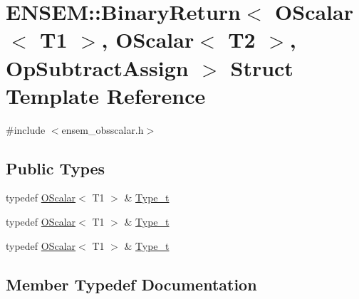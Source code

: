 \hypertarget{structENSEM_1_1BinaryReturn_3_01OScalar_3_01T1_01_4_00_01OScalar_3_01T2_01_4_00_01OpSubtractAssign_01_4}{}\section{E\+N\+S\+EM\+:\+:Binary\+Return$<$ O\+Scalar$<$ T1 $>$, O\+Scalar$<$ T2 $>$, Op\+Subtract\+Assign $>$ Struct Template Reference}
\label{structENSEM_1_1BinaryReturn_3_01OScalar_3_01T1_01_4_00_01OScalar_3_01T2_01_4_00_01OpSubtractAssign_01_4}


{\ttfamily \#include $<$ensem\+\_\+obsscalar.\+h$>$}

\subsection*{Public Types}
\begin{DoxyCompactItemize}
\item 
typedef \mbox{\hyperlink{classENSEM_1_1OScalar}{O\+Scalar}}$<$ T1 $>$ \& \mbox{\hyperlink{structENSEM_1_1BinaryReturn_3_01OScalar_3_01T1_01_4_00_01OScalar_3_01T2_01_4_00_01OpSubtractAssign_01_4_a56c648d7318d544c513534130a020867}{Type\+\_\+t}}
\item 
typedef \mbox{\hyperlink{classENSEM_1_1OScalar}{O\+Scalar}}$<$ T1 $>$ \& \mbox{\hyperlink{structENSEM_1_1BinaryReturn_3_01OScalar_3_01T1_01_4_00_01OScalar_3_01T2_01_4_00_01OpSubtractAssign_01_4_a56c648d7318d544c513534130a020867}{Type\+\_\+t}}
\item 
typedef \mbox{\hyperlink{classENSEM_1_1OScalar}{O\+Scalar}}$<$ T1 $>$ \& \mbox{\hyperlink{structENSEM_1_1BinaryReturn_3_01OScalar_3_01T1_01_4_00_01OScalar_3_01T2_01_4_00_01OpSubtractAssign_01_4_a56c648d7318d544c513534130a020867}{Type\+\_\+t}}
\end{DoxyCompactItemize}


\subsection{Member Typedef Documentation}
\mbox{\label{structENSEM_1_1BinaryReturn_3_01OScalar_3_01T1_01_4_00_01OScalar_3_01T2_01_4_00_01OpSubtractAssign_01_4_a56c648d7318d544c513534130a020867}} 
